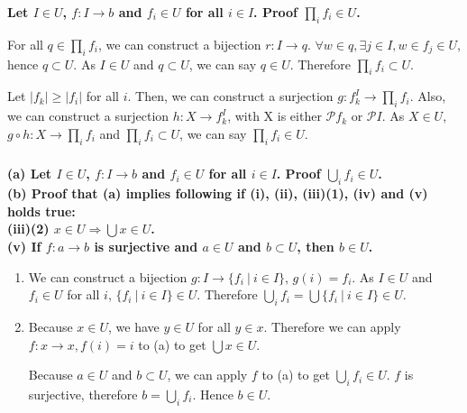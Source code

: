 \documentclass{article}
\begin{document}
\subsubsection{}

\textbf{Let $I \in U$, $f : I \rightarrow b $ and $f_i \in U$ for all $i \in I$. Proof $\prod_i f_i \in U$.}

For all $q \in \prod_i f_i$, we can construct a bijection $r : I \rightarrow q$. $\forall w \in q, \exists j \in I, w \in f_j \in U$, hence $q \subset U$. As $I \in U$ and $q \subset U$, we can say $q \in U$. Therefore $\prod_i f_i \subset U$.

Let $|f_k| \geq |f_i|$ for all $i$. Then, we can construct a surjection $g : f_k^I \rightarrow \prod_i f_i$. Also, we can construct a surjection $h : X \rightarrow f_k^I$, with X is either $\mathcal{P} f_k$ or $\mathcal{P} I$. As $X \in U$, $g \circ h : X \rightarrow \prod_i f_i$ and $\prod_i f_i \subset U$, we can say $\prod_i f_i \in U$.

\subsubsection{}

\textbf{(a) Let $I \in U$, $f : I \rightarrow b $ and $f_i \in U$ for all $i \in I$. Proof $\bigcup_i f_i \in U$. \\ (b) Proof that (a) implies following if (i), (ii), (iii)(1), (iv) and (v) holds true: \\ \indent (iii)(2) $x \in U \Rightarrow \bigcup x \in U$. \\ \indent (v) If $f : a \rightarrow b$ is surjective and $a \in U$ and $b \subset U$, then $b \in U$.
}

\begin{enumerate}[label=(\alph*)]
\item We can construct a bijection $g :  I \rightarrow \{f_i\ |\ i \in I\}$, $g(i) = f_i$. As $I \in U$ and $f_i \in U$ for all $i$, $\{f_i\ |\ i \in I\} \in U$. Therefore $ \bigcup_i f_i = \bigcup \{f_i\ |\ i \in I\} \in U$.
\item Because $x \in U$, we have $y \in U$ for all $y \in x$. Therefore we can apply $f : x \rightarrow x, f(i) = i$ to (a) to get $\bigcup x \in U$.

Because $a \in U$ and $b \subset U$, we can apply $f$ to (a) to get $\bigcup_i f_i \in U$. $f$ is surjective, therefore $b = \bigcup_i f_i$. Hence $b \in U$.
\end{enumerate}
\end{document}
